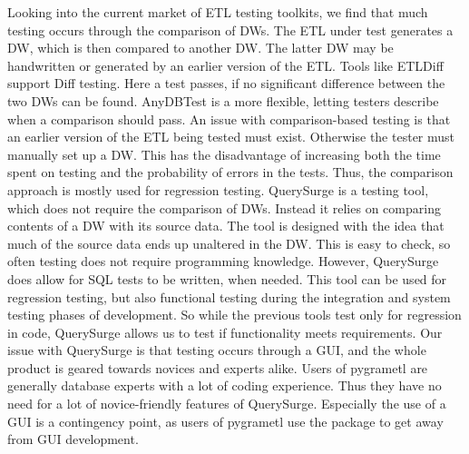 Looking into the current market of ETL testing toolkits, we find that much testing occurs through the comparison of DWs. The ETL under test generates a DW, which is then compared to another DW. The latter DW may be handwritten or generated by an earlier version of the ETL. Tools like ETLDiff\cite{thomsen2006etldiff} support Diff testing. Here a test passes, if no significant difference between the two DWs can be found. AnyDBTest\cite{AnyDbTest} is a more flexible, letting testers describe when a comparison should pass. An issue with comparison-based testing is that an earlier version of the ETL being tested must exist. Otherwise the tester must manually set up a DW. This has the disadvantage of increasing both the time spent on testing and the probability of errors in the tests. Thus, the comparison approach is mostly used for  regression testing. QuerySurge\cite{QuerySurge} is a testing tool, which does not require the comparison of DWs. Instead it relies on comparing contents of a DW with its source data. The tool is designed with the idea that much of the source data ends up unaltered in the DW. This is easy to check, so often testing does not require programming knowledge. However, QuerySurge does allow for SQL tests to be written, when needed. This tool can be used for regression testing, but also functional testing during the integration and system testing phases of development. So while the previous tools test only for regression in code, QuerySurge allows us to test if functionality meets requirements. Our issue with QuerySurge is that testing occurs through a GUI, and the whole product is geared towards novices and experts alike. Users of pygrametl are generally database experts with a lot of coding experience. Thus they have no need for a lot of novice-friendly features of QuerySurge. Especially the use of a GUI is a contingency point, as users of pygrametl use the package to get away from GUI development. 

